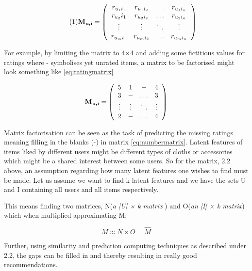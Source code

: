 \[  
\label{eq:ratingmatrix} \tag{1}
\textbf{M\textsubscript{u,i}} = \left(
\begin{array}{cccc}
r_{{u_1}{i_1}}&r_{{u_1}{i_2}}& \ldots&r_{{u_1}{i_n}} \\
r_{u_2}{i_1}&r_{{u_2}{i_2}}& \ldots&r_{{u_2}{i_n}} \\
\vdots & \vdots & \ddots & \vdots \\
r_{{u_m}{i_1}}&r_{{u_m}{i_2}}& \ldots&r_{{u_m}{i_n}}
\end{array}
\right)
\]

For example, by limiting the matrix to 4×4 and adding some fictitious values for ratings
where - symbolises yet unrated items, a matrix to be factorised might look something
like \eqref{eq:ratingmatrix}


\[  
\label{eq:numbermatrix}
\textbf{M\textsubscript{u,i}} = \left(
\begin{array}{cccc}
5&1& - &4 \\
3&-&\ldots&3 \\
\vdots & \vdots & \ddots & \vdots \\
2&-& \ldots&4
\end{array}
\right)
\]

Matrix factorisation can be seen as the task of predicting the missing ratings meaning filling in the blanks (-) in matrix \eqref{eq:numbermatrix}. Latent features of items liked by different users might be different types of cloths or accessories which might be a shared interest between some users. So for the matrix, 2.2 above, an assumption regarding how many latent features one wishes to find must be made. Let us assume we want to find k latent features and we have the sets U and I containing all users and all items respectively.

This means finding two matrices, N(\textit{a  |U| × k matrix }) and O(\textit{an  |I| × k  matrix}) which when multiplied approximating M:

\[ M \approx N \times O = \hat{M} \]

Further, using similarity and prediction computing techniques as described under 2.2, the gaps can be filled in and thereby resulting in really good recommendations.

